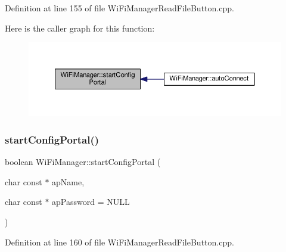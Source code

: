 Definition at line 155 of file Wi\+Fi\+Manager\+Read\+File\+Button.\+cpp.

Here is the caller graph for this function\+:\nopagebreak
\begin{figure}[H]
\begin{center}
\leavevmode
\includegraphics[width=350pt]{class_wi_fi_manager_ad781751307f7f623956126096a09a545_icgraph}
\end{center}
\end{figure}
\mbox{\label{class_wi_fi_manager_afaca5021edffb4d9a5bd39f7b0f7a686}} 
\subsubsection{\texorpdfstring{start\+Config\+Portal()}{startConfigPortal()}\hspace{0.1cm}{\footnotesize\ttfamily [2/2]}}
{\footnotesize\ttfamily boolean Wi\+Fi\+Manager\+::start\+Config\+Portal (\begin{DoxyParamCaption}\item[{char const $\ast$}]{ap\+Name,  }\item[{char const $\ast$}]{ap\+Password = {\ttfamily NULL} }\end{DoxyParamCaption})}



Definition at line 160 of file Wi\+Fi\+Manager\+Read\+File\+Button.\+cpp.

